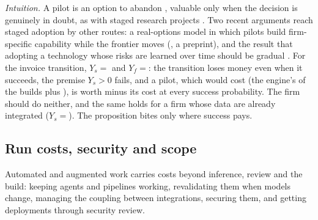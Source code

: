 \noindent\emph{Intuition.} A pilot is an option to abandon \citep{mcdonald1986value,dixit1994investment}, valuable only when the decision is genuinely in doubt, as with staged research projects \citep{roberts1981funding}. Two recent arguments reach staged adoption by other routes: a real-options model in which pilots build firm-specific capability while the frontier moves (\citealp{tewari2026pilot}, a preprint), and the result that adopting a technology whose risks are learned over time should be gradual \citep{acemoglu2024regulating}. For the invoice transition, $Y_s={}$\icYs{} and $Y_f={}$\icYf: the transition loses money even when it succeeds, the premise $Y_s>0$ fails, and a pilot, which would cost \icFpil{} (the engine's \icPilotShare{} of the builds plus \icPilotFixed), is worth minus its cost at every success probability. The firm should do neither, and the same holds for a firm whose data are already integrated ($Y_s={}$\icYsb). The proposition bites only where success pays.

\subsection{Run costs, security and scope}\label{sec:tasks-ancillary}

Automated and augmented work carries costs beyond inference, review and the build: keeping agents and pipelines working, revalidating them when models change, managing the coupling between integrations, securing them, and getting deployments through security review.

